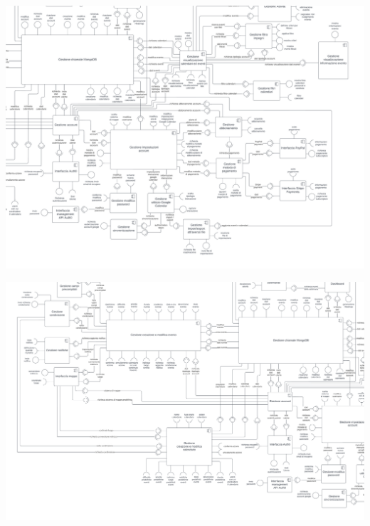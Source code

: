 \begin{center}
    \includegraphics[width=1\textwidth,height=0.4\textheight]{img/Diagrammi/Componenti/P3_Diagramma_dei_componenti.png}
\end{center}
\begin{center}
    \includegraphics[width=1\textwidth,height=0.4\textheight]{img/Diagrammi/Componenti/P4_Diagramma_dei_componenti.png}
\end{center}

